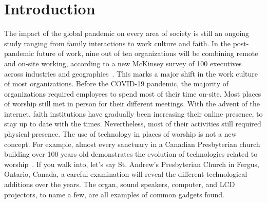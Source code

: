 \section{Introduction}
\label{sec:intro}
The impact of the global pandemic on every area of society is still an ongoing study ranging from family interactions to work culture and faith. In the post-pandemic future of work, nine out of ten organizations will be combining remote and on-site working, according to a new McKinsey survey of 100 executives across industries and geographies~\cite{andrea:alexander}. This marks a major shift in the work culture of most organizations. Before the COVID-19 pandemic, the majority of organizations required employees to spend most of their time on-site. Most places of worship still met in person for their different meetings. With the advent of the internet, faith institutions have gradually been increasing their online presence, to stay up to date with the times. Nevertheless, most of their activities still required physical presence. The use of technology in places of worship is not a new concept. For example, almost every sanctuary in a Canadian Presbyterian church building over 100 years old demonstrates the evolution of technologies related to worship~\cite{260105620200101}. If you walk into, let's say St. Andrew’s Presbyterian Church in Fergus, Ontario, Canada, a careful examination will reveal the different technological additions over the years. The organ, sound speakers, computer, and LCD projectors, to name a few, are all examples of common gadgets found. 

